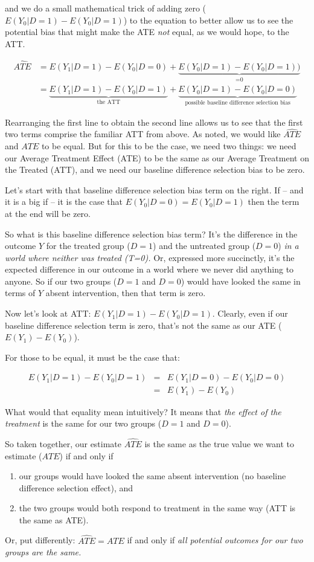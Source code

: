 \documentclass[11pt]{article}
\begin{document}
and we do a small mathematical trick of adding zero ($E(Y_{0}|D=1) - E(Y_{0}|D=1)$) to the equation to better allow us to see the potential bias that might make the ATE \emph{not} equal, as we would hope, to the ATT.

\begin{align*}
      \widehat{ATE }&=  E(Y_{1}|D=1) - E(Y_{0}|D=0) + \underbrace{E(Y_{0}|D=1) - E(Y_{0}|D=1))}_\text{=0} \\
        &= \underbrace{E(Y_{1}|D=1) - E(Y_{0}|D=1)}_\text{the ATT} + \underbrace{E(Y_{0}|D=1) - E(Y_{0}|D=0) }_\text{possible baseline difference selection bias}
\end{align*}

Rearranging the first line to obtain the second line allows us to see that the first two terms comprise the familiar ATT from above.  As noted, we would like $\widehat{ATE}$ and $ATE$ to be equal. But for this to be the case, we need two things: we need our Average Treatment Effect (ATE) to be the same as our Average Treatment on the Treated (ATT), and we need our baseline difference selection bias to be zero.


Let's start with that baseline difference selection bias term on the right. If -- and it is a big if -- it is the case that $E(Y_{0}|D=0) = E(Y_{0}|D=1)$ then the term at the end will be zero.

So what is this baseline difference selection bias term? It's the difference in the outcome $Y$ for the treated group ($D=1$) and the untreated group ($D=0$) \emph{in a world where neither was treated (T=0).} Or, expressed more succinctly, it's the expected difference in our outcome in a world where we never did anything to anyone. So if our two groups ($D=1$ and $D=0$) would have looked the same in terms of $Y$ absent intervention, then that term is zero.

Now let's look at ATT: $E(Y_{1}|D=1) - E(Y_{0}|D=1)$. Clearly, even if our baseline difference selection term is zero, that's not the same as our ATE ($E(Y_{1}) - E(Y_{0})$).

For those to be equal, it must be the case that:

\begin{eqnarray}
E(Y_{1}|D=1) - E(Y_{0}|D=1) &=& E(Y_{1}|D=0) - E(Y_{0}|D=0) \nonumber\\
 &=& E(Y_{1}) - E(Y_{0}) \nonumber
\end{eqnarray}

What would that equality mean intuitively? It means that \emph{the effect of the treatment} is the same for our two groups ($D=1$ and $D=0$).

So taken together, our estimate $\widehat{ATE}$ is the same as the true value we want to estimate ($ATE$) if and only if
\begin{enumerate}
  \item our groups would have looked the same absent intervention (no baseline difference selection effect), and
  \item the two groups would both respond to treatment in the same way (ATT is the same as ATE).
\end{enumerate}

Or, put differently: $\widehat{ATE} = ATE$ if and only if \emph{all potential outcomes for our two groups are the same.}
\end{document}
